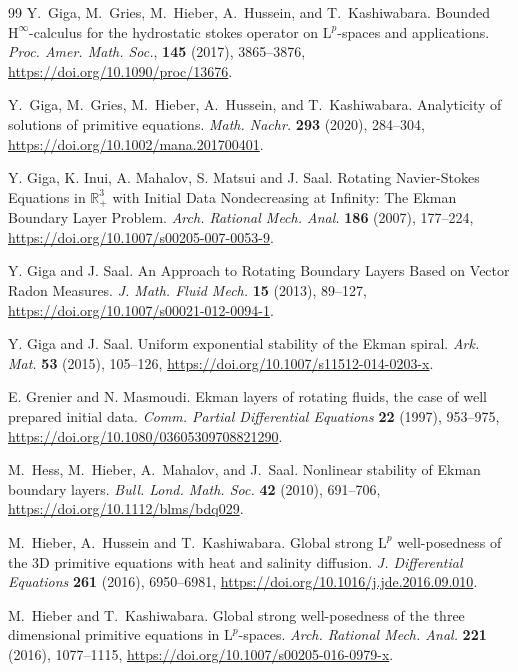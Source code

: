 \documentclass[preprint]{elsarticle}
\numberwithin{equation}{section}
\newcommand {\R}	{\mathbb{R}}
\newcommand{\rL}{\mathrm{L}}
\newcommand{\rLp}{\rL^p}
\begin{document}
\begin{thebibliography}{99}
	Y.~Giga, M.~Gries, M.~Hieber, A.~Hussein, and T.~Kashiwabara.
	Bounded $\mathrm{H}^\infty$-calculus for the hydrostatic stokes operator on
	$\mathrm{L}^p$-spaces and applications.
	{\em Proc. Amer. Math. Soc.}, \textbf{145} (2017), 3865--3876,
	\url{https://doi.org/10.1090/proc/13676}.
	
	Y.~Giga, M.~Gries, M.~Hieber, A.~Hussein, and T.~Kashiwabara.
	Analyticity of solutions of primitive equations.
	{\em Math. Nachr.} \textbf{293} (2020), 284--304, 
	\url{https://doi.org/10.1002/mana.201700401}.
	
	Y. Giga, K. Inui, A. Mahalov, S. Matsui and J. Saal.
	Rotating Navier-Stokes Equations in $\R^3_+$
	with Initial Data Nondecreasing at Infinity: The Ekman Boundary Layer Problem.
	{\em Arch. Rational Mech. Anal.} \textbf{186} (2007), 177--224, 
	\url{https://doi.org/10.1007/s00205-007-0053-9}.
	
	Y. Giga and J. Saal.
	An Approach to Rotating Boundary Layers Based on Vector Radon Measures.
	{\em J. Math. Fluid Mech.} \textbf{15} (2013), 89--127, 
	\url{https://doi.org/10.1007/s00021-012-0094-1}.
	
	Y. Giga and J. Saal.
	Uniform exponential stability of the Ekman spiral.
	{\em Ark. Mat.} \textbf{53} (2015), 105--126, 
	\url{https://doi.org/10.1007/s11512-014-0203-x}.
	
	E. Grenier and N. Masmoudi.
	Ekman layers of rotating fluids, the case of well prepared
	initial data.
	\textit{Comm. Partial Differential Equations} \textbf{22} (1997), 953--975,
	\url{https://doi.org/10.1080/03605309708821290}.
	
	M.~Hess, M.~Hieber, A.~Mahalov, and J.~Saal.
	Nonlinear stability of Ekman boundary layers.
	\textit{Bull. Lond. Math. Soc.} \textbf{42} (2010), 691--706,
	\url{https://doi.org/10.1112/blms/bdq029}.
	
	M.~Hieber, A.~Hussein and T.~Kashiwabara.
	Global strong $\rLp$ well-posedness of the 3D primitive equations with heat and salinity diffusion.
	\textit{J. Differential Equations} \textbf{261} (2016), 6950--6981,
	\url{https://doi.org/10.1016/j.jde.2016.09.010}.
	
	M.~Hieber and T.~Kashiwabara.
	Global strong well-posedness of the three dimensional primitive
	equations in $\mathrm{L}^p$-spaces.
	{\em Arch. Rational Mech. Anal.} \textbf{221} (2016), 1077--1115, 
	\url{https://doi.org/10.1007/s00205-016-0979-x}.
	

\end{thebibliography}
\end{document}
